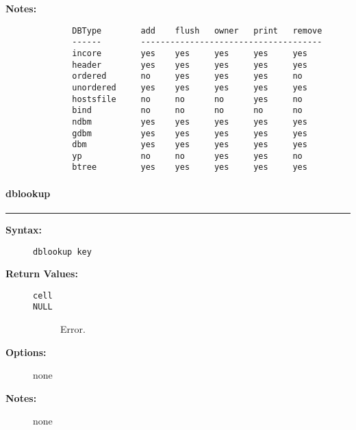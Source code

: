 \begin{description}
\begin{description}
\end{description}


\item[{\bf Notes:}] \mbox{}

\begin{tscreen}
\begin{verbatim}
        DBType        add    flush   owner   print   remove
        ------        -------------------------------------
        incore        yes    yes     yes     yes     yes
        header        yes    yes     yes     yes     yes
        ordered       no     yes     yes     yes     no
        unordered     yes    yes     yes     yes     yes
        hostsfile     no     no      no      yes     no
        bind          no     no      no      no      no
        ndbm          yes    yes     yes     yes     yes
        gdbm          yes    yes     yes     yes     yes
        dbm           yes    yes     yes     yes     yes
        yp            no     no      yes     yes     no
        btree         yes    yes     yes     yes     yes
\end{verbatim}
\end{tscreen}


\end{description}


\vspace {2pt}


\paragraph{dblookup}

\hrule
\begin{description}
\item[{\bf Syntax:}] \mbox{}

{\tt dblookup key}

\item[{\bf Return Values:}] \mbox{}

\begin{description}
\item[{\tt cell}] \mbox{}



\item[{\tt NULL}] \mbox{}

Error.  

\end{description}


\item[{\bf Options:}] \mbox{}

none

\item[{\bf Notes:}] \mbox{}

none

\end{description}



